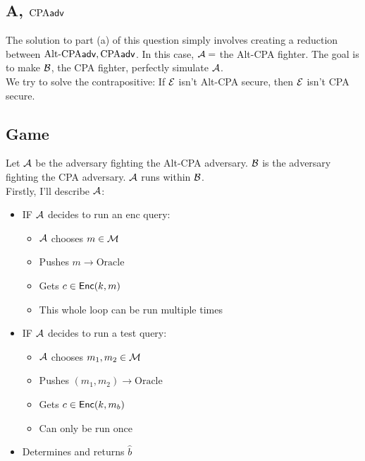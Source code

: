 \documentclass[12pt]{article}
\theoremstyle{plain}
\theoremstyle{definition}
\begin{document}
\begin{solution}
\section*{A, $\textrm{CPA}\textsf{adv}$}
The solution to part (a) of this question simply involves creating a reduction between $\textrm{Alt-CPA}\textsf{adv}, \textrm{CPA}\textsf{adv}$. In this case, $\mathcal{A} =$ the Alt-CPA fighter.
The goal is to make $\mathcal{B}$, the CPA fighter, perfectly simulate $\mathcal{A}$. \\

\noindent We try to solve the contrapositive: If $\mathcal{E}$ isn't Alt-CPA secure, then $\mathcal{E}$ isn't CPA secure.

\subsection*{Game}
Let $\mathcal{A}$ be the adversary fighting the Alt-CPA adversary. $\mathcal{B}$ is the adversary fighting the CPA adversary. $\mathcal{A}$ runs within $\mathcal{B}$.\\

\noindent Firstly, I'll describe $\mathcal{A}$:
\begin{itemize}
  \item IF $\mathcal{A}$ decides to run an enc query:
  \begin{itemize}
    \item $\mathcal{A}$ chooses $m \in \mathcal{M}$
    \item Pushes $m \to \text{Oracle}$
    \item Gets $c \in \textsf{\upshape Enc}(k, m)$
    \item This whole loop can be run multiple times
  \end{itemize}
  \item IF $\mathcal{A}$ decides to run a test query:
  \begin{itemize}
    \item $\mathcal{A}$ chooses $m_1, m_2 \in \mathcal{M}$
    \item Pushes $(m_1, m_2) \to \text{Oracle}$
    \item Gets $c \in \textsf{\upshape Enc}(k, m_b)$
    \item Can only be run once
  \end{itemize}
  \item Determines and returns $\hat{b}$
\end{itemize}


\end{solution}
\end{document}
